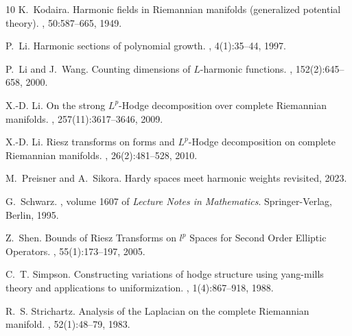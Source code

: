 \documentclass[12pt]{amsart}
\begin{document}
\begin{thebibliography}{10}
	K.~Kodaira.
	\newblock Harmonic fields in {R}iemannian manifolds (generalized potential
	theory).
	, 50:587--665, 1949.
	
	P.~Li.
	\newblock Harmonic sections of polynomial growth.
	, 4(1):35--44, 1997.
	
	P.~Li and J.~Wang.
	\newblock Counting dimensions of {{\(L\)}}-harmonic functions.
	, 152(2):645--658, 2000.
	
	X.-D. Li.
	\newblock On the strong {$L^p$}-{H}odge decomposition over complete
	{R}iemannian manifolds.
	, 257(11):3617--3646, 2009.
	
	X.-D. Li.
	\newblock Riesz transforms on forms and {$L^p$}-{H}odge decomposition on
	complete {R}iemannian manifolds.
	, 26(2):481--528, 2010.
	
	M.~Preisner and A.~Sikora.
	\newblock Hardy spaces meet harmonic weights revisited, 2023.
	
	G.~Schwarz.
	, volume 1607 of {\em Lecture Notes in Mathematics}.
	\newblock Springer-Verlag, Berlin, 1995.
	
	Z.~Shen.
	\newblock Bounds of {Riesz} {Transforms} on $l^p$ {Spaces} for {Second} {Order}
	{Elliptic} {Operators}.
	, 55(1):173--197, 2005.
	
	C.~T. Simpson.
	\newblock Constructing variations of hodge structure using yang-mills theory
	and applications to uniformization.
	, 1(4):867--918,
	1988.
	
	R.~S. Strichartz.
	\newblock Analysis of the {L}aplacian on the complete {R}iemannian manifold.
	, 52(1):48--79, 1983.
	
\end{thebibliography}
\end{document}
